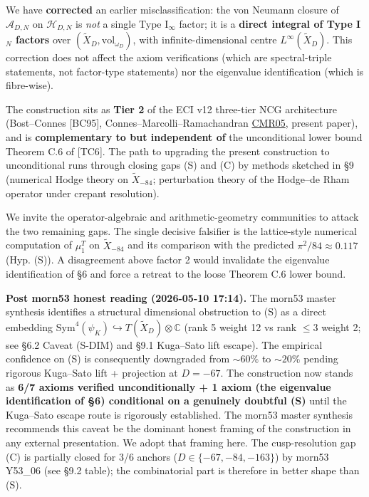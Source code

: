 \documentclass[
  11pt,
  a4paper,
]{amsart}
\begin{document}
We have \textbf{corrected} an earlier misclassification: the von Neumann closure of
\(\mathcal{A}_{D,N}\) on \(\mathcal{H}_{D,N}\) is \emph{not} a single Type I\(_\infty\)
factor; it is a \textbf{direct integral of Type I\(_N\) factors} over
\((\widetilde{X}_D, \mathrm{vol}_{\omega_D})\), with infinite-dimensional centre
\(L^\infty(\widetilde{X}_D)\). This correction does not affect the axiom
verifications (which are spectral-triple statements, not factor-type
statements) nor the eigenvalue identification (which is fibre-wise).

The construction sits as \textbf{Tier 2} of the ECI v12 three-tier NCG architecture
(Bost--Connes {[}BC95{]}, Connes--Marcolli--Ramachandran \href{Connes–Marcolli–Ramachandran\%20BC\%20system\%20for\%20imaginary\%20quadratic}{CMR05}, present paper),
and is \textbf{complementary to but independent of} the unconditional lower bound
Theorem C.6 of {[}TC6{]}. The path to upgrading the present construction to
unconditional runs through closing gaps (S) and (C) by methods sketched in §9
(numerical Hodge theory on \(\widetilde{X}_{-84}\); perturbation theory of the
Hodge--de Rham operator under crepant resolution).

We invite the operator-algebraic and arithmetic-geometry communities to
attack the two remaining gaps. The single decisive falsifier is the
lattice-style numerical computation of \(\mu_1^T\) on \(\widetilde{X}_{-84}\) and
its comparison with the predicted \(\pi^2/84 \approx 0.117\) (Hyp. (S)). A
disagreement above factor 2 would invalidate the eigenvalue identification of
§6 and force a retreat to the loose Theorem C.6 lower bound.

\textbf{Post morn53 honest reading (2026-05-10 17:14).} The morn53 master synthesis
identifies a structural dimensional obstruction to (S) as a direct embedding
\(\mathrm{Sym}^4(\psi_K) \hookrightarrow T(\widetilde{X}_D) \otimes \mathbb{C}\)
(rank 5 weight 12 vs rank \(\le 3\) weight 2; see §6.2 Caveat (S-DIM) and §9.1
Kuga--Sato lift escape). The empirical confidence on (S) is consequently
downgraded from \(\sim 60\%\) to \(\sim 20\%\) pending rigorous Kuga--Sato lift +
projection at \(D = -67\). The construction now stands as \textbf{6/7 axioms verified
unconditionally + 1 axiom (the eigenvalue identification of §6) conditional on a
genuinely doubtful (S)} until the Kuga--Sato escape route is rigorously
established. The morn53 master synthesis recommends this caveat be the dominant
honest framing of the construction in any external presentation. We adopt that
framing here. The cusp-resolution gap (C) is partially closed for 3/6 anchors
(\(D \in \{-67, -84, -163\}\)) by morn53 Y53\_06 (see §9.2 table); the
combinatorial part is therefore in better shape than (S).
\end{document}

